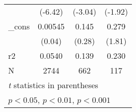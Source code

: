 \begin{table}[htbp]
\begin{tabular}{l*{3}{c}}
            &     (-6.42)         &     (-3.04)         &     (-1.92)         \\
[1em]
\_cons      &     0.00545         &       0.145         &       0.279         \\
            &      (0.04)         &      (0.28)         &      (1.81)         \\
\hline
r2          &      0.0540         &       0.139         &       0.230         \\
N           &        2744         &         662         &         117         \\
\hline\hline
\multicolumn{4}{l}{\footnotesize \textit{t} statistics in parentheses}\\
\multicolumn{4}{l}{\footnotesize \sym{*} \(p<0.05\), \sym{**} \(p<0.01\), \sym{***} \(p<0.001\)}\\
\end{tabular}
\end{table}
